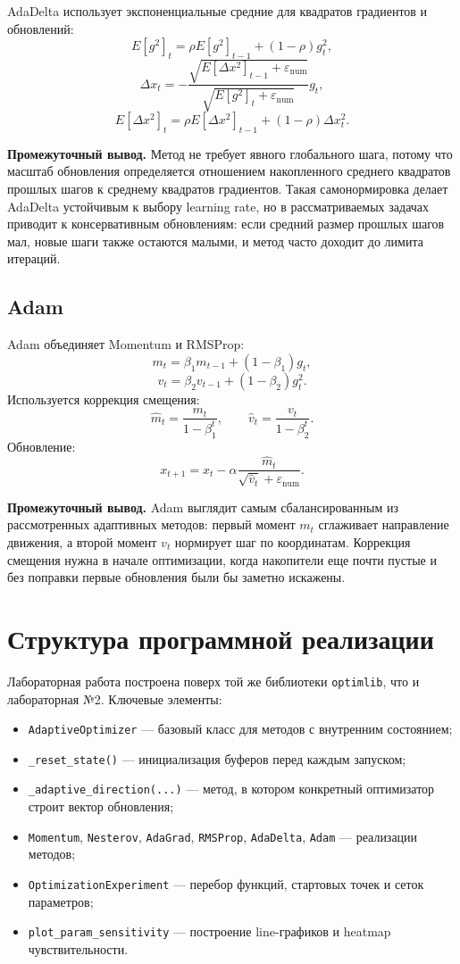 ﻿\documentclass[14pt,a4paper]{extarticle}
\begin{document}
AdaDelta использует экспоненциальные средние для квадратов градиентов и обновлений:
\[
    E[g^2]_t=\rho E[g^2]_{t-1}+(1-\rho)g_t^2,
\]
\[
    \Delta x_t=-\frac{\sqrt{E[\Delta x^2]_{t-1}+\varepsilon_{\mathrm{num}}}}
    {\sqrt{E[g^2]_t+\varepsilon_{\mathrm{num}}}}g_t,
\]
\[
    E[\Delta x^2]_t=\rho E[\Delta x^2]_{t-1}+(1-\rho)\Delta x_t^2.
\]

\textbf{Промежуточный вывод.} Метод не требует явного глобального шага, потому что масштаб обновления определяется отношением накопленного среднего квадратов прошлых шагов к среднему квадратов градиентов. Такая самонормировка делает AdaDelta устойчивым к выбору learning rate, но в рассматриваемых задачах приводит к консервативным обновлениям: если средний размер прошлых шагов мал, новые шаги также остаются малыми, и метод часто доходит до лимита итераций.

\subsection{Adam}

Adam объединяет Momentum и RMSProp:
\[
    m_t=\beta_1m_{t-1}+(1-\beta_1)g_t,
\]
\[
    v_t=\beta_2v_{t-1}+(1-\beta_2)g_t^2.
\]
Используется коррекция смещения:
\[
    \hat{m}_t=\frac{m_t}{1-\beta_1^t}, \qquad
    \hat{v}_t=\frac{v_t}{1-\beta_2^t}.
\]
Обновление:
\[
    x_{t+1}=x_t-\alpha\frac{\hat{m}_t}{\sqrt{\hat{v}_t}+\varepsilon_{\mathrm{num}}}.
\]

\textbf{Промежуточный вывод.} Adam выглядит самым сбалансированным из рассмотренных адаптивных методов: первый момент $m_t$ сглаживает направление движения, а второй момент $v_t$ нормирует шаг по координатам. Коррекция смещения нужна в начале оптимизации, когда накопители еще почти пустые и без поправки первые обновления были бы заметно искажены.

\section{Структура программной реализации}

Лабораторная работа построена поверх той же библиотеки \texttt{optimlib}, что и лабораторная №2. Ключевые элементы:
\begin{itemize}
    \item \texttt{AdaptiveOptimizer} --- базовый класс для методов с внутренним состоянием;
    \item \texttt{\_reset\_state()} --- инициализация буферов перед каждым запуском;
    \item \texttt{\_adaptive\_direction(...)} --- метод, в котором конкретный оптимизатор строит вектор обновления;
    \item \texttt{Momentum}, \texttt{Nesterov}, \texttt{AdaGrad}, \texttt{RMSProp}, \texttt{AdaDelta}, \texttt{Adam} --- реализации методов;
    \item \texttt{OptimizationExperiment} --- перебор функций, стартовых точек и сеток параметров;
    \item \texttt{plot\_param\_sensitivity} --- построение line-графиков и heatmap чувствительности.
\end{itemize}
\end{document}
